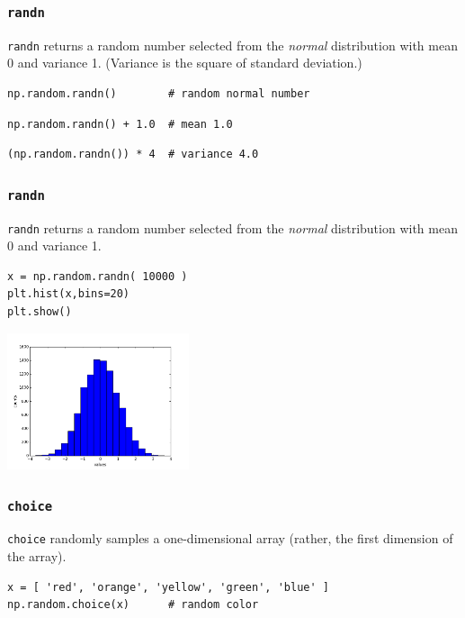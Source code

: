 \documentclass[11pt]{beamer}
\begin{document}
\begin{frame}[fragile]
  \frametitle{\texttt{randn}}
  \Enlarge

  \begin{enumerate}
  \myitem  \texttt{randn} returns a random number selected from the \emph{normal} distribution with mean 0 and variance 1.
  \mysubitem  (Variance is the square of standard deviation.)
  \end{enumerate}
  \begin{Verbatim}
np.random.randn()        # random normal number
  \end{Verbatim}
  \begin{Verbatim}
np.random.randn() + 1.0  # mean 1.0
  \end{Verbatim}
  \begin{Verbatim}
(np.random.randn()) * 4  # variance 4.0
  \end{Verbatim}
\end{frame}

\begin{frame}[fragile]
  \frametitle{\texttt{randn}}
  \Enlarge

  \begin{enumerate}
  \myitem  \texttt{randn} returns a random number selected from the \emph{normal} distribution with mean 0 and variance 1.
  \end{enumerate}
  \begin{Verbatim}
x = np.random.randn( 10000 )
plt.hist(x,bins=20)
plt.show()
  \end{Verbatim}
  \includegraphics[width=0.4\textwidth]{./img/hist-normal.png}
\end{frame}

\begin{frame}[fragile]
  \frametitle{\texttt{choice}}
  \Enlarge

  \begin{enumerate}
  \myitem  \texttt{choice} randomly samples a one-dimensional array (rather, the first dimension of the array).
  \end{enumerate}
  \begin{Verbatim}
x = [ 'red', 'orange', 'yellow', 'green', 'blue' ]
np.random.choice(x)      # random color
  \end{Verbatim}
\end{frame}
\end{document}
